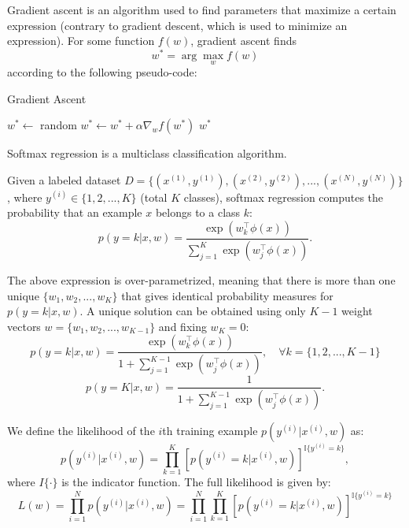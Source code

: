 \documentclass[lang=cn,11pt]{elegantbook}
\begin{document}
Gradient ascent is an algorithm used to find parameters that maximize a certain expression (contrary to
gradient descent, which is used to minimize an expression). For some function $f(w)$, gradient ascent finds
\begin{equation}
    w^* = \arg\max_w f(w)
\end{equation}
according to the following pseudo-code:

\begin{algorithm}
\caption{Gradient Ascent}
\begin{algorithmic}[1]
    \State $w^* \gets$ random
    \Repeat
        \State $w^* \gets w^* + \alpha \nabla_w f(w^*)$
    \State \Return $w^*$
\end{algorithmic}
\end{algorithm}

Softmax regression is a multiclass classification algorithm. 

Given a labeled dataset \(D = \{(x^{(1)}, y^{(1)}), (x^{(2)}, y^{(2)}), ..., (x^{(N)}, y^{(N)})\}\), where $y^{(i)} \in \{1, 2, ...,K\}$ (total $K$ classes), softmax regression computes the probability that an example $x$ belongs to a class $k$:
\begin{equation}
    p(y = k | x, w) = \frac{\exp(w_k^\top \phi(x))}{\sum_{j=1}^{K} \exp(w_j^\top \phi(x))}.
\end{equation}

The above expression is over-parametrized, meaning that there is more than one unique $\{w_1,w_2, ...,w_K\}$ that gives identical probability measures for $p(y = k|x,w)$. A unique solution can be obtained using only $K-1$ weight vectors $w = \{w_1,w_2, ...,w_{K-1}\}$ and fixing $w_K = 0$:
\begin{equation}
    p(y = k|x,w) = \frac{\exp(w_k^\top \phi(x))}{1 + \sum_{j=1}^{K-1} \exp(w_j^\top \phi(x))}, \quad \forall k = \{1, 2, ...,K - 1\}
\end{equation}
\begin{equation}
    p(y = K|x,w) = \frac{1}{1 + \sum_{j=1}^{K-1} \exp(w_j^\top \phi(x))}.
\end{equation}

We define the likelihood of the $i$th training example $p(y^{(i)}|x^{(i)},w)$ as:
\begin{equation}
    p(y^{(i)}|x^{(i)},w) = \prod_{k=1}^{K} \left[ p(y^{(i)} = k|x^{(i)},w) \right]^{\mathbb{I}\{y^{(i)}=k\}},
\end{equation}
where $I\{\cdot\}$ is the indicator function. The full likelihood is given by:
\begin{equation}
    L(w) = \prod_{i=1}^{N} p(y^{(i)}|x^{(i)},w) = \prod_{i=1}^{N} \prod_{k=1}^{K} \left[ p(y^{(i)} = k|x^{(i)},w) \right]^{\mathbb{I}\{y^{(i)}=k\}}
\end{equation}
\end{document}
